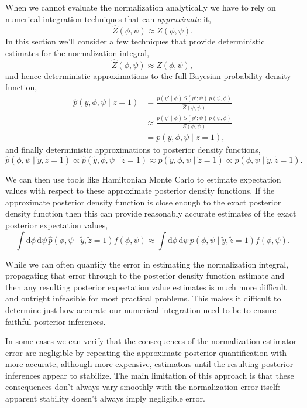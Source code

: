 \documentclass[
  letterpaper,
  DIV=11,
  numbers=noendperiod]{scrartcl}
\begin{document}
When we cannot evaluate the normalization analytically we have to rely
on numerical integration techniques that can \emph{approximate} it, \[
\hat{Z}(\phi, \psi) \approx Z(\phi, \psi).
\] In this section we'll consider a few techniques that provide
deterministic estimates for the normalization integral, \[
\hat{Z}(\phi, \psi) \approx Z(\phi, \psi),
\] and hence deterministic approximations to the full Bayesian
probability density function, \begin{align*}
\hat{p}(y, \phi, \psi \mid z = 1)
&=
\frac{ p(y' \mid \phi) \, S(y'; \psi ) \, p(\psi, \phi) }{ \hat{Z}(\phi, \psi) }
\\
&\approx
\frac{ p(y' \mid \phi) \, S(y'; \psi ) \, p(\psi, \phi) }{ Z(\phi, \psi) }
\\
&=
p(y, \phi, \psi \mid z = 1),
\end{align*} and finally deterministic approximations to posterior
density functions, \[
\hat{p}( \phi, \psi \mid \tilde{y}, \tilde{z} = 1)
\propto
\hat{p}(\tilde{y}, \phi, \psi \mid \tilde{z} = 1)
\approx
p(\tilde{y}, \phi, \psi \mid \tilde{z} = 1)
\propto
p( \phi, \psi \mid \tilde{y}, \tilde{z} = 1).
\]

We can then use tools like Hamiltonian Monte Carlo to estimate
expectation values with respect to these approximate posterior density
functions. If the approximate posterior density function is close enough
to the exact posterior density function then this can provide reasonably
accurate estimates of the exact posterior expectation values, \[
\int \mathrm{d} \phi \, \mathrm{d} \psi \,
\hat{p}(\phi, \psi \mid \tilde{y}, \tilde{z} = 1) f(\phi, \psi)
\approx
\int \mathrm{d} \phi \, \mathrm{d} \psi \,
p(\phi, \psi \mid \tilde{y}, \tilde{z} = 1) f(\phi, \psi).
\]

While we can often quantify the error in estimating the normalization
integral, propagating that error through to the posterior density
function estimate and then any resulting posterior expectation value
estimates is much more difficult and outright infeasible for most
practical problems. This makes it difficult to determine just how
accurate our numerical integration need to be to ensure faithful
posterior inferences.

In some cases we can verify that the consequences of the normalization
estimator error are negligible by repeating the approximate posterior
quantification with more accurate, although more expensive, estimators
until the resulting posterior inferences appear to stabilize. The main
limitation of this approach is that these consequences don't always vary
smoothly with the normalization error itself: apparent stability doesn't
always imply negligible error.
\end{document}
